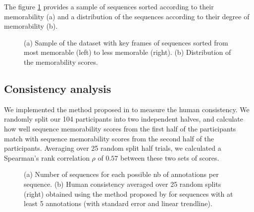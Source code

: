 \documentclass[sigconf]{acmart}
\begin{document}
The figure \ref{fig:overview} provides a sample of sequences sorted according to their memorability (a) and a distribution of the sequences according to their degree of memorability (b).

\begin{figure}[!htbp]
	\centering
	\quad
	\quad
	\caption{\label{fig:overview}(a) Sample of the dataset with key frames of sequences sorted from most memorable (left) to less memorable (right). (b) Distribution of the memorability scores.}
\end{figure}

\subsection{Consistency analysis}
We implemented the method proposed in \cite{isola_2014_makes} to measure the human consistency.
We randomly split our 104 participants into two independent halves, and calculate how well sequence memorability scores from the first half of the participants match with sequence memorability scores from the second half of the participants.
Averaging over 25 random split half trials, we calculated a Spearman's rank correlation $\rho$ of $0.57$ between these two sets of scores.

\begin{figure}[!htbp]
	\centering
	\quad
	\quad
	\caption{\label{fig:human_consistency}(a) Number of sequences for each possible nb of annotations per sequence. (b) Human consistency averaged over 25 random splits (right) obtained using the method proposed by \cite{isola_2014_makes} for sequences with at least 5 annotations (with standard error and linear trendline).}
\end{figure}
\end{document}
